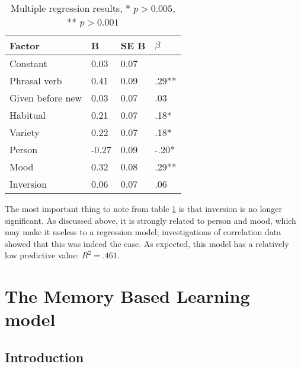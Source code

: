 \documentclass[12pt]{article}
\begin{document}
\begin{table}[h] \centering
\begin{tabular}{|l||l|l|l|}
\hline
Factor&B&SE B& $\beta$ \\
\hline
Constant&0.03&0.07&\\
Phrasal verb&0.41&0.09&.29**\\
Given before new&0.03&0.07&.03\\
Habitual&0.21&0.07&.18*\\
Variety&0.22&0.07&.18*\\
Person&-0.27&0.09&-.20*\\
Mood&0.32&0.08&.29**\\
Inversion&0.06&0.07&.06\\
\hline
\end{tabular}
\caption{Multiple regression results, * $ p > 0.005$, **  $p > 0.001$ }
\label{restable}
\end{table}
The most important thing to note from table \ref{restable} is that inversion is no longer significant. As discussed above, it is strongly related to person and mood, which may make it useless to a regression model; investigations of correlation data showed that this was indeed the case. As expected, this model has a relatively low predictive value: $R^2 = .461$.\\\indent

\section{The Memory Based Learning model} \label{mbl}

\subsection{Introduction}
\end{document}
